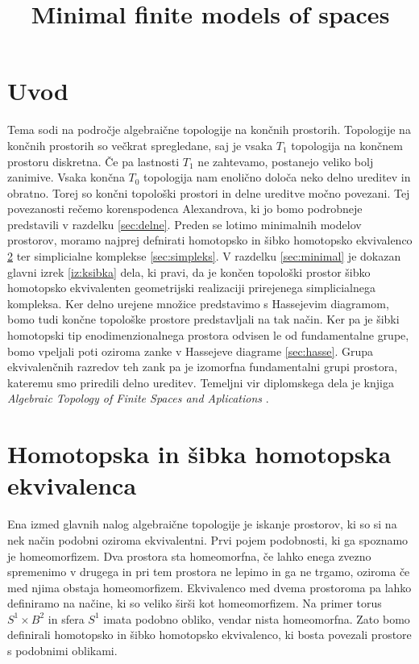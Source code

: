 \documentclass[mat1]{fmfdelo}
\title{Minimal finite models of spaces}
\begin{document}
\tableofcontents

\section{Uvod}
Tema sodi na področje algebraične topologije na končnih prostorih. Topologije na končnih prostorih so večkrat spregledane, saj je vsaka $T_1$ topologija
na končnem prostoru diskretna. Če pa lastnosti $T_1$ ne zahtevamo, postanejo veliko bolj zanimive. Vsaka končna $T_0$ 
topologija nam enolično določa neko delno ureditev in obratno. Torej so končni topološki prostori in delne ureditve močno povezani. Tej povezanosti rečemo korenspodenca Alexandrova, ki jo bomo podrobneje predstavili v razdelku \ref{sec:delne}. Preden se lotimo minimalnih modelov prostorov, moramo najprej 
defnirati homotopsko in šibko homotopsko ekvivalenco \ref{sec:1} ter simplicialne komplekse \ref{sec:simpleks}. V razdelku \ref{sec:minimal} je dokazan glavni izrek \ref{iz:ksibka} dela, ki pravi, da je končen topološki prostor šibko homotopsko ekvivalenten geometrijski realizaciji 
prirejenega simplicialnega kompleksa. Ker delno urejene množice predstavimo s Hassejevim diagramom, bomo tudi končne topološke prostore predstavljali na tak način. Ker pa je šibki homotopski tip enodimenzionalnega prostora odvisen le od fundamentalne 
grupe, bomo vpeljali poti oziroma zanke v Hassejeve diagrame \ref{sec:hasse}. Grupa ekvivalenčnih razredov teh zank pa je izomorfna fundamentalni grupi prostora, kateremu smo priredili delno ureditev. Temeljni vir diplomskega dela je knjiga 
\textit{Algebraic Topology of Finite Spaces and Aplications} \cite{Solr-0000594456}.


\section{Homotopska in šibka homotopska ekvivalenca}\label{sec:1}

Ena izmed glavnih nalog algebraične topologije je iskanje prostorov, ki so si 
na nek način podobni oziroma ekvivalentni. Prvi pojem podobnosti, ki ga spoznamo
je homeomorfizem. Dva prostora sta homeomorfna, če lahko enega zvezno spremenimo v drugega in pri tem prostora ne lepimo in ga ne trgamo, oziroma če med njima obstaja homeomorfizem. Ekvivalenco med dvema 
prostoroma pa lahko definiramo na načine, ki so veliko širši kot homeomorfizem.
Na primer torus $S^1\times B^2$ in sfera $S^1$ imata podobno obliko, vendar nista
 homeomorfna. Zato bomo definirali homotopsko in šibko homotopsko ekvivalenco, ki bosta povezali prostore s podobnimi oblikami.
\end{document}
